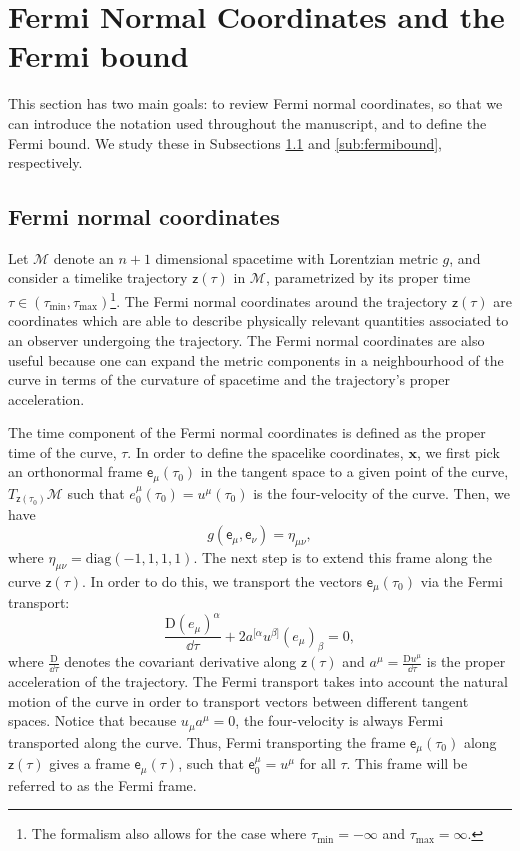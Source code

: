 \documentclass[prd,twocolumn,superscriptaddress,floatfix,amsmath,amssymb,amsfonts,longbibliography,nofootinbib]{revtex4-1}
\newcommand{\mf}{\mathsf}%
\begin{document}
\section{Fermi Normal Coordinates and the Fermi bound}\label{sec:FNC}


This section has two main goals: to review Fermi normal coordinates, so that we can introduce the notation used throughout the manuscript, and to define the Fermi bound. We study these in Subsections \ref{sub:fnc} and \ref{sub:fermibound}, respectively. 


\subsection{Fermi normal coordinates}\label{sub:fnc}

Let $\mathcal{M}$ denote an $n+1$ dimensional spacetime with Lorentzian metric $g$, and consider a timelike trajectory $\mf z(\tau)$ in $\mathcal{M}$, parametrized by its proper time \mbox{$\tau\in(\tau_{\text{min}},\tau_{\text{max}})$}\footnote{The formalism also allows for the case where $\tau_{\text{min}} = -\infty$ and $\tau_{\text{max}} = \infty$.}. The Fermi normal coordinates around the trajectory $\mf z(\tau)$ are coordinates which are able to describe physically relevant quantities associated to an observer undergoing the trajectory. The Fermi normal coordinates are also useful because one can expand the metric components in a neighbourhood of the curve in terms of the curvature of spacetime and the trajectory's proper acceleration.

The time component of the Fermi normal coordinates is defined as the proper time of the curve, $\tau$. In order to define the spacelike coordinates, $\bm x$, we first pick an orthonormal frame $\mf{e}_\mu(\tau_0)$ in the tangent space to a given point of the curve, $T_{\mf z(\tau_0)}\mathcal{M}$ such that $e_0^\mu(\tau_0) = u^\mu(\tau_0)$ is the four-velocity of the curve. Then, we have
\begin{equation}
    g(\mf e_\mu,\mf e_\nu) = \eta_{\mu\nu},
\end{equation}
where $\eta_{\mu\nu} = \text{diag}(-1,1,1,1)$. The next step is to extend this frame along the curve $\mf z(\tau)$. In order to do this, we transport the vectors $\mf e_\mu(\tau_0)$ via the Fermi transport:
\begin{equation}
    \frac{\text{D}(e_\mu)^\alpha}{\dd \tau} + 2a^{[\alpha}u^{\beta]}(e_\mu)_\beta = 0, 
\end{equation}
where $\frac{\text{D}}{\dd \tau}$ denotes the covariant derivative along $\mf z(\tau)$ and $a^\mu = \frac{\text{D}u^\mu}{\dd \tau}$ is the proper acceleration of the trajectory. The Fermi transport takes into account the natural motion of the curve in order to transport vectors between different tangent spaces. Notice that because $u_\mu a^\mu = 0$, the four-velocity is always Fermi transported along the curve. Thus, Fermi transporting the frame $\mf e_\mu(\tau_0)$ along $\mf z(\tau)$ gives a frame $\mf e_\mu(\tau)$, such that $\mf e^\mu_0 = u^\mu$ for all $\tau$. This frame will be referred to as the Fermi frame.
\end{document}
